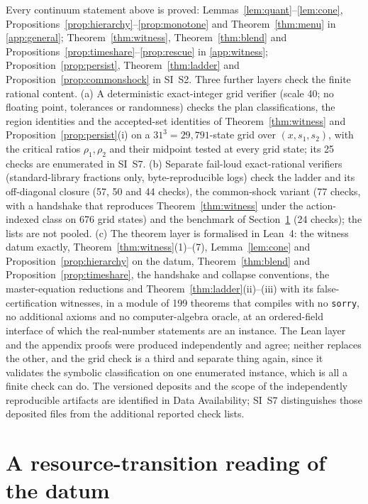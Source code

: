 \documentclass[preprint,11pt,authoryear]{elsarticle}
\theoremstyle{definition}
\theoremstyle{remark}
\begin{document}
Every continuum statement above is proved: Lemmas~\ref{lem:quant}--\ref{lem:cone}, Propositions~\ref{prop:hierarchy}--\ref{prop:monotone} and Theorem~\ref{thm:menu} in \ref{app:general}; Theorem~\ref{thm:witness}, Theorem~\ref{thm:blend} and Propositions~\ref{prop:timeshare}--\ref{prop:rescue} in \ref{app:witness}; Proposition~\ref{prop:persist}, Theorem~\ref{thm:ladder} and Proposition~\ref{prop:commonshock} in SI~S2. Three further layers check the finite rational content. (a) A deterministic exact-integer grid verifier (scale 40; no floating point, tolerances or randomness) checks the plan classifications, the region identities and the accepted-set identities of Theorem~\ref{thm:witness} and Proposition~\ref{prop:persist}(i) on a $31^3=29{,}791$-state grid over $(x,s_1,s_2)$, with the critical ratios $\rho_1,\rho_2$ and their midpoint tested at every grid state; its 25 checks are enumerated in SI~S7. (b) Separate fail-loud exact-rational verifiers (standard-library fractions only, byte-reproducible logs) check the ladder and its off-diagonal closure (57, 50 and 44 checks), the common-shock variant (77 checks, with a handshake that reproduces Theorem~\ref{thm:witness} under the action-indexed class on 676 grid states) and the benchmark of Section~\ref{sec:benchmark} (24 checks); the lists are not pooled. (c) The theorem layer is formalised in Lean~4: the witness datum exactly, Theorem~\ref{thm:witness}(1)--(7), Lemma~\ref{lem:cone} and Proposition~\ref{prop:hierarchy} on the datum, Theorem~\ref{thm:blend} and Proposition~\ref{prop:timeshare}, the handshake and collapse conventions, the master-equation reductions and Theorem~\ref{thm:ladder}(ii)--(iii) with its false-certification witnesses, in a module of 199 theorems that compiles with no \texttt{sorry}, no additional axioms and no computer-algebra oracle, at an ordered-field interface of which the real-number statements are an instance. The Lean layer and the appendix proofs were produced independently and agree; neither replaces the other, and the grid check is a third and separate thing again, since it validates the symbolic classification on one enumerated instance, which is all a finite check can do. The versioned deposits and the scope of the independently reproducible artifacts are identified in Data Availability; SI~S7 distinguishes those deposited files from the additional reported check lists.

\section{A resource-transition reading of the datum}\label{sec:benchmark}
\end{document}
